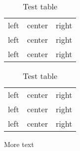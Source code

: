 \documentclass{article}
\begin{document}
\begin{table}[p]
  \centering
  \begin{tabular}{lcr}
    left & center & right \\
    left & center & right \\
    left & center & right \\
  \end{tabular}
  \caption{Test table}
\end{table}

\begin{table}[p]
  \centering
  \begin{tabular}{lcr}
    left & center & right \\
    left & center & right \\
    left & center & right \\
  \end{tabular}
  \caption{Test table}
\end{table}
 
\lipsum[2]
More text
\end{document}
